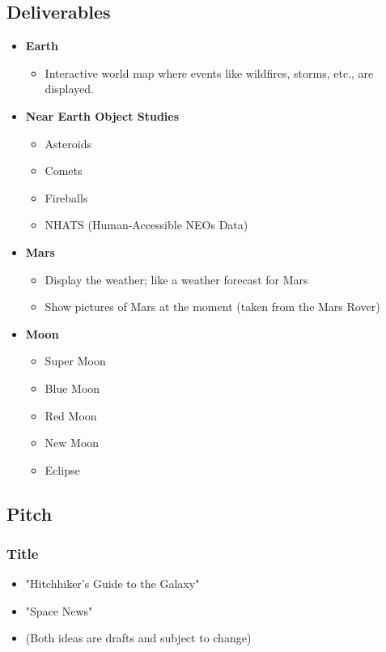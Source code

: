 \documentclass{article}
\begin{document}
\subsection*{Deliverables}
\begin{itemize}
    \item \textbf{Earth}
          \begin{itemize}
              \item Interactive world map where events like wildfires, storms, etc., are displayed.
          \end{itemize}
    \item \textbf{Near Earth Object Studies}
          \begin{itemize}
              \item Asteroids
              \item Comets
              \item Fireballs
              \item NHATS (Human-Accessible NEOs Data)
          \end{itemize}
    \item \textbf{Mars}
          \begin{itemize}
              \item Display the weather; like a weather forecast for Mars
              \item Show pictures of Mars at the moment (taken from the Mars Rover)
          \end{itemize}
    \item \textbf{Moon}
          \begin{itemize}
              \item Super Moon
              \item Blue Moon
              \item Red Moon
              \item New Moon
              \item Eclipse
          \end{itemize}
\end{itemize}
\newpage
\subsection*{Pitch}
\subsubsection*{Title}
\begin{itemize}
    \item "Hitchhiker's Guide to the Galaxy"
    \item "Space News"
    \item (Both ideas are drafts and subject to change)
\end{itemize}
\end{document}
